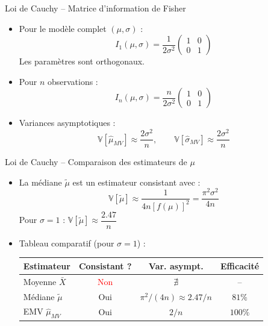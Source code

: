 \documentclass[11pt,aspectratio=169]{beamer}
\begin{document}
\begin{frame}{Loi de Cauchy -- Matrice d'information de Fisher}

\begin{itemize}

\item Pour le modèle complet $(\mu, \sigma)$ :
  \[
  I_1(\mu, \sigma) = \frac{1}{2\sigma^2}\begin{pmatrix} 1 & 0 \\ 0 & 1 \end{pmatrix}
  \]
  Les paramètres sont orthogonaux.\newline

\item Pour $n$ observations :
  \[
  \boxed{I_n(\mu, \sigma) = \frac{n}{2\sigma^2}\begin{pmatrix} 1 & 0 \\ 0 & 1 \end{pmatrix}}
  \]

\item Variances asymptotiques :
  \[
  \mathbb{V}[\hat{\mu}_{MV}] \approx \frac{2\sigma^2}{n}, \qquad \mathbb{V}[\hat{\sigma}_{MV}] \approx \frac{2\sigma^2}{n}
  \]

\end{itemize}

\end{frame}

\begin{frame}{Loi de Cauchy -- Comparaison des estimateurs de $\mu$}

\begin{itemize}

\item La médiane $\tilde{\mu}$ est un estimateur consistant avec :
  \[
  \mathbb{V}[\tilde{\mu}] \approx \frac{1}{4n[f(\mu)]^2} = \frac{\pi^2 \sigma^2}{4n}
  \]
  Pour $\sigma = 1$ : $\mathbb{V}[\tilde{\mu}] \approx \dfrac{2.47}{n}$\newline

\item Tableau comparatif (pour $\sigma = 1$) :\newline

\begin{center}
\begin{tabular}{lccc}
\hline
Estimateur & Consistant ? & Var. asympt. & Efficacité \\
\hline
Moyenne $\bar{X}$ & \textcolor{red}{Non} & $\nexists$ & -- \\
Médiane $\tilde{\mu}$ & Oui & $\pi^2/(4n) \approx 2.47/n$ & $81\%$ \\
EMV $\hat{\mu}_{MV}$ & Oui & $2/n$ & $100\%$ \\
\hline
\end{tabular}
\end{center}

\end{itemize}

\end{frame}
\end{document}

